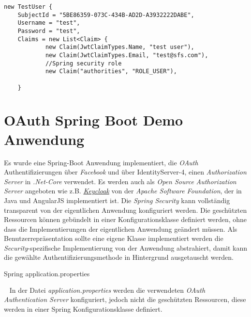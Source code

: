 \begin{verbatim}
new TestUser {
	SubjectId = "5BE86359-073C-434B-AD2D-A3932222DABE",
	Username = "test",
	Password = "test",
	Claims = new List<Claim> {
			new Claim(JwtClaimTypes.Name, "test user"),
			new Claim(JwtClaimTypes.Email, "test@sfs.com"),
			//Spring security role
			new Claim("authorities", "ROLE_USER"),
			
	}
\end{verbatim}

\section{OAuth Spring Boot Demo Anwendung}
Es wurde eine Spring-Boot Anwendung implementiert, die \emph{OAuth} Authentifizierungen über \emph{Facebook} und über IdentityServer-4, einen \emph{Authorization Server} in \emph{.Net-Core} verwendet. Es werden auch als \emph{Open Source} \emph{Authorization Server} angeboten wie z.B. \href{http://www.keycloak.org/}{\emph{Keycloak}} von der \emph{Apache Software Foundation}, der in Java und AngularJS implementiert ist. 
\newline
\newline
Die \emph{Spring Security} kann vollständig transparent von der eigentlichen Anwendung konfiguriert werden. Die geschützten Ressourcen können gebündelt in einer Konfigurationsklasse definiert werden, ohne dass die Implementierungen der eigentlichen Anwendung geändert müssen. Als Benutzerrepräsentation sollte eine eigene Klasse implementiert werden die \emph{Security}-spezifische Implementierung von der Anwendung abstrahiert, damit kann die gewählte Authentifizierungsmethode in Hintergrund ausgetauscht werden.

\begin{code}
	\caption{Spring application.properties}
	\label{source:epidemiology-logistic}
\end{code}
\ \newline
\newline
In der Datei \emph{application.properties} werden die verwendeten \emph{OAuth Authentication Server} konfiguriert, jedoch nicht die geschützten Ressourcen, diese werden in einer Spring Konfigurationsklasse definiert.
\newpage


